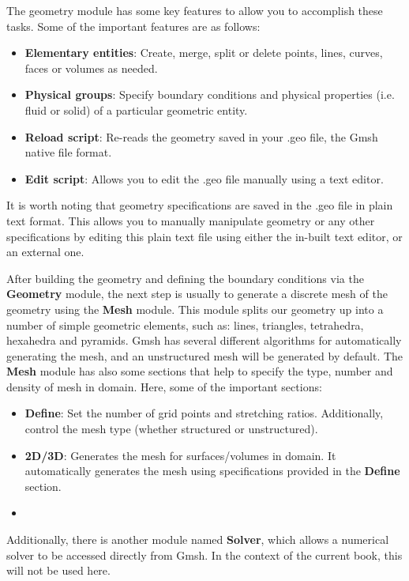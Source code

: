 The geometry module has some key features to allow you to accomplish these tasks. Some of the important features are as follows:
\begin{itemize}
    \item \textbf{Elementary entities}: Create, merge, split or delete points, lines, curves, faces or volumes as needed.
    \item \textbf{Physical groups}: Specify boundary conditions and physical properties (i.e. fluid or solid) of a particular geometric entity.
    \item \textbf{Reload script}: Re-reads the geometry saved in your .geo file, the Gmsh native file format.
    \item \textbf{Edit script}: Allows you to edit the .geo file manually using a text editor.
\end{itemize}
It is worth noting that geometry specifications are saved in the .geo file in plain text format. This allows you to manually manipulate geometry or any other specifications by editing this plain text file using either the in-built text editor, or an external one. 

After building the geometry and defining the boundary conditions via the \textbf{Geometry} module, the next step is usually to generate a discrete mesh of the geometry using the \textbf{Mesh} module. This module splits our geometry up into a number of simple geometric elements, such as: lines, triangles, tetrahedra, hexahedra and pyramids. Gmsh has several different algorithms for automatically generating the mesh, and an unstructured mesh will be generated by default. The \textbf{Mesh} module has also some sections that help to specify the type, number and density of mesh in domain. Here, some of the important sections:
\begin{itemize}
    \item \textbf{Define}: Set the number of grid points and stretching ratios. Additionally, control the mesh type (whether structured or unstructured).
    \item \textbf{2D/3D}: Generates the mesh for surfaces/volumes in domain. It automatically generates the mesh using specifications provided in the \textbf{Define} section.
    \item 
\end{itemize}
Additionally, there is another module named \textbf{Solver}, which allows a numerical solver to be accessed directly from Gmsh. In the context of the current book, this will not be used here.

